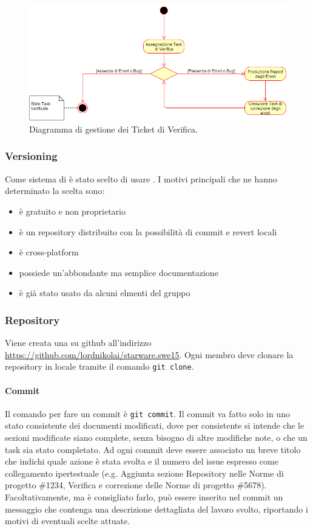\documentclass[12pt,a4paper]{article}
\begin{document}
\begin{center}
\begin{figure}[H]
\centering
\label{f2-Ticket Verifica}
\includegraphics[scale=0.5]{ticketVerifica.png}
\caption{Diagramma di gestione dei Ticket di Verifica.}
\end{figure}
\end{center}

\newpage
\subsubsection{Versioning} %
Come sistema di  è stato scelto di usare . I motivi principali che ne hanno determinato la scelta sono:
\begin{itemize}
\item è gratuito e non proprietario
\item è un repository distribuito con la possibilità di commit e revert locali
\item è cross-platform
\item possiede un'abbondante ma semplice documentazione
\item è già stato usato da alcuni elmenti del gruppo
\end{itemize}

\subsubsection{Repository} %
Viene creata una  su github all'indirizzo \url{https://github.com/lordnikolai/starware.swe15}. Ogni membro deve clonare la repository in locale tramite il comando \texttt{git clone}.
\paragraph{Commit}
Il comando per fare un commit è \texttt{git commit}. Il commit va fatto solo in uno stato consistente dei documenti modificati, dove per consistente si intende che le sezioni modificate siano complete, senza bisogno di altre modifiche note, o che un task sia stato completato. Ad ogni commit deve essere associato un breve titolo che indichi quale azione è stata svolta e il numero del issue espresso come collegamento ipertestuale (e.g. Aggiunta sezione Repository nelle Norme di progetto \#1234, Verifica e correzione delle Norme di progetto \#5678). Facoltativamente, ma è consigliato farlo, può essere inserito nel commit un messaggio che contenga una descrizione dettagliata del lavoro svolto, riportando i motivi di eventuali scelte attuate.
\end{document}
